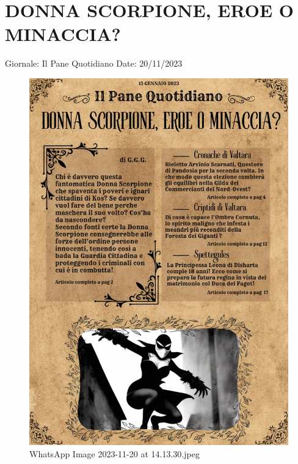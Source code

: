 \section{DONNA SCORPIONE, EROE O
MINACCIA?}\label{donna-scorpione-eroe-o-minaccia}

Giornale: Il Pane Quotidiano Date: 20/11/2023

\begin{figure}
\centering
\includegraphics{WhatsApp_Image_2023-11-20_at_14.13.30.jpeg}
\caption{WhatsApp Image 2023-11-20 at 14.13.30.jpeg}
\end{figure}
